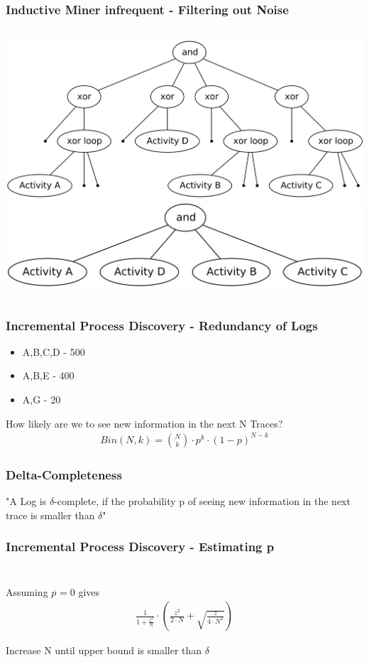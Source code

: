\documentclass{beamer}
\begin{document}
\begin{frame}
\frametitle{Inductive Miner infrequent - Filtering out Noise}
\begin{columns}
\includegraphics[width=0.8\linewidth]{img/noise.png}
\includegraphics[width=0.89\linewidth]{img/noiseless.png}
\end{columns}
\end{frame}

\begin{frame}
\frametitle{Incremental Process Discovery - Redundancy of Logs}
\begin{itemize}
\item A,B,C,D - 500
\item A,B,E - 400
\item A,G - 20
\end{itemize}
How likely are we to see new information in the next N Traces?\\
\begin{align*}
Bin(N,k)=\binom{N}{k}\cdot p^k\cdot (1-p)^{N-k}
\end{align*}
\end{frame}

\begin{frame}
\frametitle{Delta-Completeness}
\centering
\large
"A Log is $\delta$-complete, if the probability p of seeing new information in the next trace is smaller than $\delta$"
\end{frame}

\begin{frame}
\frametitle{Incremental Process Discovery - Estimating p}
\begin{align*}
[\frac{1}{1+\frac{z^2}{N}}\cdot(p^{\hat{}}+\frac{z^2}{2N}-\sqrt{\frac{p^{\hat{}}\cdot(1-p^{\hat{}})}{N}+\frac{z}{4N^2}}),\\\frac{1}{1+\frac{z^2}{N}}\cdot(p^{\hat{}}+\frac{z^2}{2N}+\sqrt{\frac{p^{\hat{}}\cdot(1-p^{\hat{}})}{N}+\frac{z}{4N^2}})]
\end{align*}\\
Assuming $p^{\hat{}}=0$ gives
\begin{align*}
\frac{1}{1+\frac{z^2}{N}}\cdot(\frac{z^2}{2\cdot N}+\sqrt{\frac{z}{4\cdot N^2}})
\end{align*}

Increase N until upper bound is smaller than $\delta$\\
\end{frame}
\end{document}
